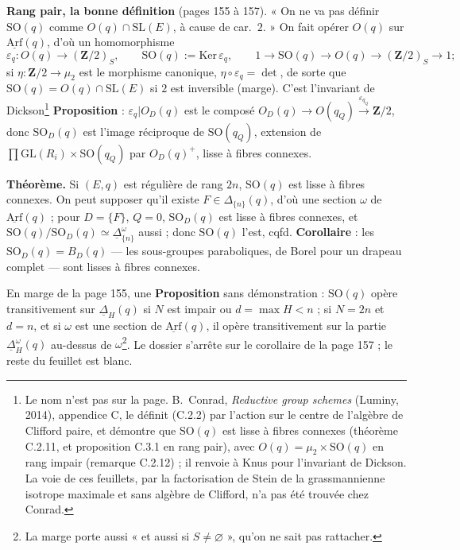 \documentclass[11pt,a4paper]{article}
\begin{document}
\textbf{Rang pair, la bonne définition} (pages 155 à 157). « On ne va pas définir
$\mathrm{SO}(q)$ comme $O(q) \cap \mathrm{SL}(E)$, à cause de car.\ $2$. » On fait opérer
$O(q)$ sur $\underline{\mathrm{Arf}}(q)$, d'où un homomorphisme
\[
  \varepsilon_q : O(q) \to (\mathbf{Z}/2)_S, \qquad \mathrm{SO}(q) :=
  \mathrm{Ker}\,\varepsilon_q, \qquad 1 \to \mathrm{SO}(q) \to O(q) \to (\mathbf{Z}/2)_S \to
  1 ;
\]
si $\eta : \mathbf{Z}/2 \to \mu_2$ est le morphisme canonique, $\eta \circ \varepsilon_q =
\det$, de sorte que $\mathrm{SO}(q) = O(q) \cap \mathrm{SL}(E)$ si $2$ est inversible
(marge). C'est l'invariant de Dickson\footnote{Le nom n'est pas sur la page.
B.~Conrad, \emph{Reductive group schemes} (Luminy, 2014), appendice C, le définit
(C.2.2) par l'action sur le centre de l'algèbre de Clifford paire, et démontre
que $\mathrm{SO}(q)$ est lisse à fibres connexes (théorème C.2.11, et
proposition C.3.1 en rang pair), avec $O(q) = \mu_2 \times \mathrm{SO}(q)$ en
rang impair (remarque C.2.12) ; il renvoie à Knus pour l'invariant de Dickson.
La voie de ces feuillets, par la factorisation de Stein de la grassmannienne
isotrope maximale et sans algèbre de Clifford, n'a pas été trouvée chez
Conrad.}
\textbf{Proposition} : $\varepsilon_q|O_D(q)$ est le composé $O_D(q) \to O(q_Q)
\xrightarrow{\varepsilon_{q_Q}} \mathbf{Z}/2$, donc $\mathrm{SO}_D(q)$ est l'image
réciproque de $\mathrm{SO}(q_Q)$, extension de $\prod \mathrm{GL}(R_i) \times
\mathrm{SO}(q_Q)$ par $O_D(q)^{+}$, lisse à fibres connexes.

\textbf{Théorème.} Si $(E, q)$ est régulière de rang $2n$, $\mathrm{SO}(q)$ est lisse à
fibres connexes. On peut supposer qu'il existe $F \in \Delta_{\{n\}}(q)$, d'où une section
$\omega$ de $\underline{\mathrm{Arf}}(q)$ ; pour $D = \{F\}$, $Q = 0$, $\mathrm{SO}_D(q)$
est lisse à fibres connexes, et $\mathrm{SO}(q)/\mathrm{SO}_D(q) \simeq
\underline{\Delta}^{\omega}_{\{n\}}$ aussi ; donc $\mathrm{SO}(q)$ l'est, cqfd.
\textbf{Corollaire} : les $\mathrm{SO}_D(q) = B_D(q)$ — les sous-groupes paraboliques,
de Borel pour un drapeau complet — sont lisses à fibres connexes.

En marge de la page 155, une \textbf{Proposition} sans démonstration :
$\mathrm{SO}(q)$ opère transitivement sur $\underline{\Delta}_H(q)$ si $N$ est impair
ou $d = \max H < n$ ; si $N = 2n$ et $d = n$, et si $\omega$ est une section de
$\underline{\mathrm{Arf}}(q)$, il opère transitivement sur la partie
$\underline{\Delta}^{\omega}_H(q)$ au-dessus de $\omega$\footnote{La marge porte aussi
« et aussi si $S \neq \varnothing$ », qu'on ne sait pas rattacher.}. Le dossier
s'arrête sur le corollaire de la page 157 ; le reste du feuillet est blanc.
\end{document}

